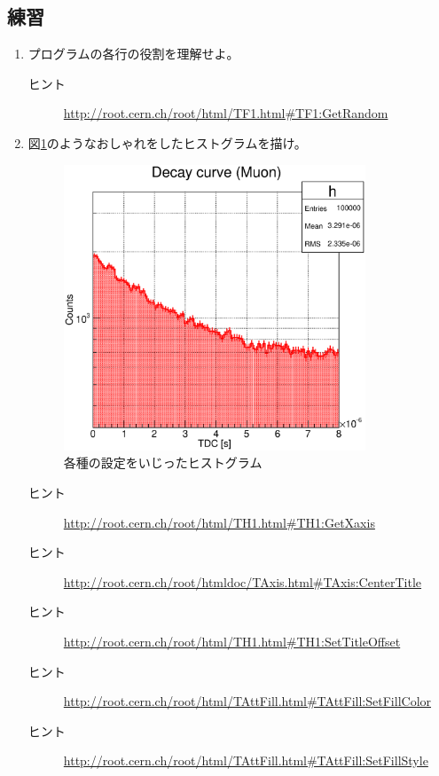   \subsection{練習}
  \begin{enumerate}
   \item プログラムの各行の役割を理解せよ。
	 \begin{description}
	  \item[ヒント] \url{http://root.cern.ch/root/html/TF1.html#TF1:GetRandom}
	 \end{description}

   \item 図\ref{Fig:ranfunsol1canvas1}のようなおしゃれをしたヒストグラムを描け。
	 \begin{figure}[htbp]
	  \begin{center}
	   \includegraphics[width = 90mm]{./picture/ranfunsol1canvas1.eps}
	  \end{center}
	  \caption{各種の設定をいじったヒストグラム}
	  \label{Fig:ranfunsol1canvas1}
	 \end{figure}
	 \begin{description}
	  \item[ヒント] \url{http://root.cern.ch/root/html/TH1.html#TH1:GetXaxis}
	  \item[ヒント] \url{http://root.cern.ch/root/htmldoc/TAxis.html#TAxis:CenterTitle}
	  \item[ヒント] \url{http://root.cern.ch/root/html/TH1.html#TH1:SetTitleOffset}
	  \item[ヒント] \url{http://root.cern.ch/root/html/TAttFill.html#TAttFill:SetFillColor}
	  \item[ヒント] \url{http://root.cern.ch/root/html/TAttFill.html#TAttFill:SetFillStyle}
	 \end{description}


\end{enumerate}
